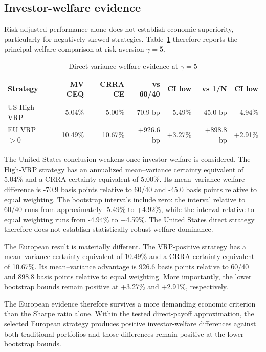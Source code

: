 \subsection{Investor-welfare evidence}

Risk-adjusted performance alone does not establish economic superiority, particularly for negatively skewed strategies. Table~\ref{tab:welfare_main} therefore reports the principal welfare comparison at risk aversion $\gamma=5$.

\begin{table}[htbp]
\centering
\small
\caption{Direct-variance welfare evidence at $\gamma=5$}
\label{tab:welfare_main}
\begin{tabularx}{\textwidth}{Xrrrrrr}
\toprule
Strategy
& MV CEQ
& CRRA CE
& vs 60/40
& CI low
& vs 1/N
& CI low \\
\midrule
US High VRP
& 5.04\%
& 5.00\%
& -70.9 bp
& -5.49\%
& -45.0 bp
& -4.94\% \\
EU VRP $>0$
& 10.49\%
& 10.67\%
& +926.6 bp
& +3.27\%
& +898.8 bp
& +2.91\% \\
\bottomrule
\end{tabularx}
\end{table}

The United States conclusion weakens once investor welfare is considered. The High-VRP strategy has an annualized mean--variance certainty equivalent of 5.04\% and a CRRA certainty equivalent of 5.00\%. Its mean--variance welfare difference is -70.9 basis points relative to 60/40 and -45.0 basis points relative to equal weighting. The bootstrap intervals include zero: the interval relative to 60/40 runs from approximately -5.49\% to +4.92\%, while the interval relative to equal weighting runs from -4.94\% to +4.59\%. The United States direct strategy therefore does not establish statistically robust welfare dominance.

The European result is materially different. The VRP-positive strategy has a mean--variance certainty equivalent of 10.49\% and a CRRA certainty equivalent of 10.67\%. Its mean--variance advantage is 926.6 basis points relative to 60/40 and 898.8 basis points relative to equal weighting. More importantly, the lower bootstrap bounds remain positive at +3.27\% and +2.91\%, respectively.

The European evidence therefore survives a more demanding economic criterion than the Sharpe ratio alone. Within the tested direct-payoff approximation, the selected European strategy produces positive investor-welfare differences against both traditional portfolios and those differences remain positive at the lower bootstrap bounds.

